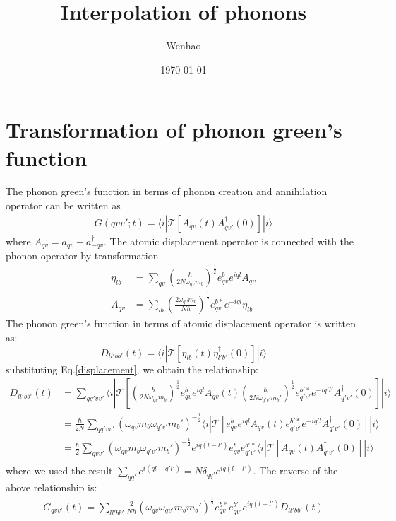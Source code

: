 \documentclass{article}
\begin{document}
\title{Interpolation of phonons}
\author{Wenhao}
\date{\today}
\maketitle

\section{Transformation of phonon green's function}
The phonon green's function in terms of 
phonon creation and annihilation operator can be written as
\begin{align}
    G(qvv';t) = \langle i | \mathcal{T}[A_{qv}(t)A_{qv'}^{\dagger}(0)]| i \rangle \label{green_A}
\end{align}
where $A_{qv} = a_{qv} + a^{\dagger}_{-qv}$. The atomic displacement operator 
is connected with the phonon operator by transformation
\begin{align}
    \eta_{lb} &= \sum_{qv} \left(\frac{\hbar}{2N\omega_{qv}m_b}\right)^{\frac{1}{2}} 
        e_{qv}^b e^{iql} A_{qv} \label{displacement} \\
    A_{qv} &= \sum_{lb} \left( \frac{2\omega_{qv} m_b}{N\hbar} \right)^{\frac{1}{2}}
        e_{qv}^{b*} e^{-iql} \eta_{lb}
\end{align}
The phonon green's function in terms of atomic displacement operator is 
written as:
\begin{equation}
    D_{ll'bb'}(t) =  \langle i | \mathcal{T}[\eta_{lb}(t)\eta_{l'b'}^{\dagger}(0)]| i \rangle
\end{equation}
substituting Eq.\ref{displacement}, we obtain the relationship:
\begin{align}
    D_{ll'bb'}(t) &= \sum_{qq'vv'} \langle i | \mathcal{T}[
        \left(\frac{\hbar}{2N\omega_{qv}m_b}\right)^{\frac{1}{2}} 
        e_{qv}^b e^{iql} A_{qv}(t)
         \left(\frac{\hbar}{2N\omega_{q'v'}m_b'}\right)^{\frac{1}{2}} 
        e_{q'v'}^{b'*} e^{-iq'l'} A_{q'v'}^{\dagger}(0)]| i \rangle \\
        &= \frac{\hbar}{2N}\sum_{qq'vv'} (\omega_{qv}m_b\omega_{q'v'}m_b')^{-\frac{1}{2}} 
        \langle i | \mathcal{T}[
            e_{qv}^b e^{iql} A_{qv}(t)
            e_{q'v'}^{b'*} e^{-iq'l} A_{q'v'}^{\dagger}(0)]| i \rangle \\
        & = \frac{\hbar}{2}\sum_{qvv'} (\omega_{qv}m_b\omega_{q'v'}m_b')^{-\frac{1}{2}} 
            e^{iq(l-l')} e_{qv}^b e_{q'v'}^{b'*}
            \langle i | \mathcal{T}[A_{qv}(t) A_{q'v'}^{\dagger}(0)]| i \rangle \\
\end{align}
where we used the result $\sum_{qq'}e^{i(ql-q'l')} = N\delta_{qq'} e^{iq(l-l')}$. The 
reverse of the above relationship is:
\begin{align}
    G_{qvv'}(t) = \sum_{ll'bb'} \frac{2}{N\hbar} (\omega_{qv}\omega_{qv'}m_bm_b')^{\frac{1}{2}}
                e^{b*}_{qv}e_{qv'}^{b'} e^{iq(l-l')} D_{ll'bb'}(t)
\end{align}
\end{document}
